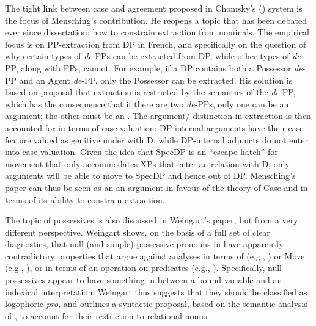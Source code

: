 \documentclass[output=paper]{langsci/langscibook}
\begin{document}
The tight link between case and agreement proposed in Chomsky’s (\citeyear{Chomsky2000,Chomsky2001Derivation})  system is the focus of Mensching’s contribution. He reopens a topic that has been debated ever since  dissertation: how to constrain extraction from nominals. The empirical focus is on PP-extraction from DP in French, and specifically on the question of why certain types of \textit{de}{}-PPs can be extracted from DP, while other types of \textit{de}{}-PP, along with  PPs, cannot. For example, if a DP contains both a Possessor \textit{de}{}-PP and an Agent \textit{de}{}-PP, only the Possessor can be extracted. His solution is based on  proposal that extraction is restricted by the semantics of the \textit{de}{}-PP, which has the consequence that if there are two \textit{de}{}-PPs, only one can be an argument; the other must be an . The argument\slash {} distinction in extraction is then accounted for in terms of case-valuation: DP-internal arguments have their case feature valued as genitive under  with D, while DP-internal adjuncts do not enter into case-valuation. Given the idea that SpecDP is an ``escape hatch'' for movement that only accommodates XPs that enter an  relation with D, only arguments will be able to move to SpecDP and hence out of DP. Mensching’s paper can thus be seen as an an argument in favour of the  theory of Case and  in terms of its ability to constrain extraction.

The topic of possessives is also discussed in Weingart’s paper, but from a very different perspective. Weingart shows, on the basis of a full set of clear diagnostics, that null (and simple) possessive pronouns in  have apparently contradictory properties that argue against analyses in terms of  (e.g., \citealt{Hicks2009}) or Move (e.g., \citealt{Floripi2009,Rodrigues2010}), or in terms of an operation on predicates (e.g., \citealt{Reinhart2006}). Specifically, null possessives appear to have something in between a bound variable and an indexical interpretation. Weingart thus suggests that they should be classified as logophoric \textit{pro}, and outlines a syntactic proposal, based on the semantic analysis of \citet{Partee1997}, to account for their restriction to relational nouns.
\end{document}
